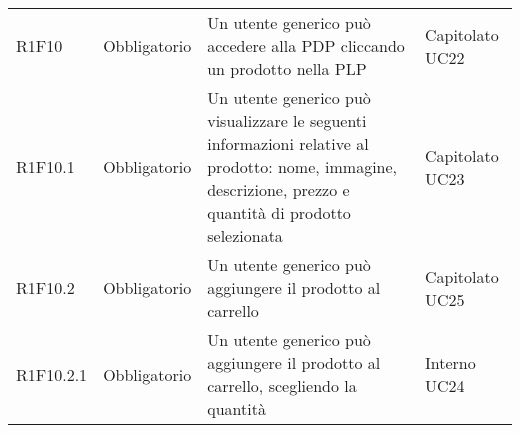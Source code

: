 {\begin{longtable}{C{2.5cm} C{2.8cm} C{6.7cm} C{2.5cm}}

R1F10 & Obbligatorio & Un utente generico può accedere alla PDP cliccando un prodotto nella PLP & Capitolato \newline UC22\\
R1F10.1 & Obbligatorio & Un utente generico può visualizzare le seguenti informazioni relative al prodotto: nome, immagine, descrizione, prezzo e quantità di prodotto selezionata & Capitolato \newline UC23\\
R1F10.2 & Obbligatorio & Un utente generico può aggiungere il prodotto al carrello & Capitolato \newline UC25\\
R1F10.2.1 & Obbligatorio & Un utente generico può aggiungere il prodotto al carrello, scegliendo la quantità & Interno \newline UC24 \\

\end{longtable}

}